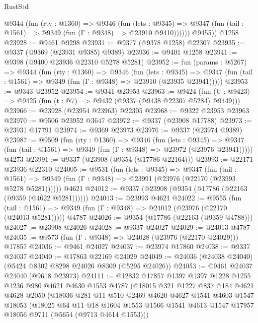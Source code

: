 \begin{lexlean}{RustStd}
\begin{coremodule}
          @9344
            (fun (rty : @1360) =>
            @9346
              (fun (lets : @9345) =>
              @9347 (fun (tail : @1561) => @9349 (fun (Γ : @9348) => @23910 @9410))))))
        @9455))
    @1258
@23928 := @9461 @9298
@23931 := @9377 (@9378 @1258) @22307
@23935 := @9337 (@9369 (@23931 @9385) @9389)
@23936 := @9401 @1258
@23941 := @9398 (@9400 @23936 @22310 @5278 @5281)
@23952 := fun (params : @5267) =>
  @9344
    (fun (rty : @1360) =>
    @9346
      (fun (lets : @9345) =>
      @9347 (fun (tail : @1561) => @9349 (fun (Γ : @9348) => @23910 (@23935 @23941)))))
@23953 := @9343 @23952
@23954 := @9341 @23953
@23963 := @9424
    (fun (U : @9423) => @9425 (fun (t : @7) => @9432 (@9337 (@9438 @22307 @5284) @9449)))
@23966 := @23928 (@23954 @23963) @22305
@23968 := @9322 @23953 @23963
@23970 := @9506 @23952 @3647
@23972 := @9337 (@23908 @17788)
@23973 := @23931 @17791
@23974 := @9369 @23973
@23976 := @9337 (@23974 @9389)
@23987 := @9509
    (fun (rty : @1360) =>
    @9346
      (fun (lets : @9345) =>
      @9347 (fun (tail : @1561) => @9349 (fun (Γ : @9348) => @23972 (@23976 @23941)))))
    @4273
@23991 := @9337 (@23908 (@9354 (@17786 @22164)))
@23993 := @22171 @23936 @22310
@24005 := @9531
    (fun (lets : @9345) =>
    @9347
      (fun (tail : @1561) =>
      @9349 (fun (Γ : @9348) => @23991 (@23976 (@22170 (@23993 @5278 @5281))))))
    @4621
@24012 := @9337 (@23908 (@9354 (@17786 (@22163 (@9359 (@4622 @5281))))))
@24013 := @23993 @4621
@24022 := @9555
    (fun (tail : @1561) => @9349 (fun (Γ : @9348) => @24012 (@23976 (@22170 (@24013 @5281)))))
    @4787
@24026 := @9354 (@17786 (@22163 (@9359 @4788)))
@24027 := @23908 @24026
@24028 := @9337 @24027
@24029 := @24013 @4787
@24035 := @9573 (fun (Γ : @9348) => @24028 (@23976 (@22170 @24029))) @17857
@24036 := @9461 @24027
@24037 := @23974 @17860
@24038 := @9337 @24037
@24040 := @17863 @22169 @24029
@24049 := @24036 (@24038 @24040) (@5424 @8302 @8298 @24026 @8309 (@5295 @24026))
@24053 := @9461 @24037 @24040 (@9618 @23973)
@24111 := @12832
    @17857
    @1397
    @1397
    @1228
    @1255
    @1236
    @980
    @4621
    @4630
    @1553
    @4787
    (@18015
      @321
      @1227
      @837
      @184
      @4621
      @4628
      @2050
      (@18036
        @281
        @11
        @510
        @2469
        @4620
        @4627
        @1541
        @4603
        @1547
        @18053
        (@18025
          @64
          @11
          @18
          @1604
          @1553
          @1566
          @1541
          @4613
          @1547
          @17957
          @18056
          @9711
          (@5654 (@9713 @4614 @1553)))

\end{coremodule}
\end{lexlean}
